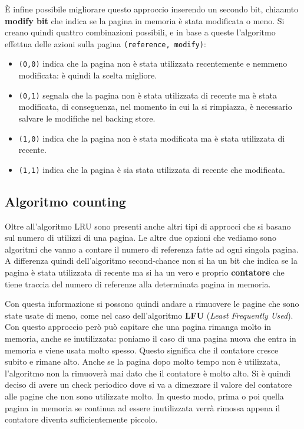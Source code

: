 È infine possibile migliorare questo approccio inserendo un secondo bit, chiaamto \textbf{modify bit} che indica se la pagina in memoria è stata modificata o meno. Si creano quindi quattro combinazioni possibili, e in base a queste l'algoritmo effettua delle azioni sulla pagina \texttt{(reference, modify)}:
\vspace{-4px}
\begin{itemize}
\setlength{\itemsep}{-1px}
    \item\texttt{(0,0)} indica che la pagina non è stata utilizzata recentemente e nemmeno modificata: è quindi la scelta migliore.
    \item\texttt{(0,1)} segnala che la pagina non è stata utilizzata di recente ma è stata modificata, di conseguenza, nel momento in cui la si rimpiazza, è necessario salvare le modifiche nel backing store.
    \item\texttt{(1,0)} indica che la pagina non è stata modificata ma è stata utilizzata di recente.
    \item\texttt{(1,1)} indica che la pagina è sia stata utilizzata di recente che modificata.
\end{itemize}

% 
\subsection{Algoritmo counting}
Oltre all'algoritmo LRU sono presenti anche altri tipi di approcci che si basano sul numero di utilizzi di una pagina. Le altre due opzioni che vediamo sono algoritmi che vanno a contare il numero di referenza fatte ad ogni singola pagina. A differenza quindi dell'algoritmo second-chance non si ha un bit che indica se la pagina è stata utilizzata di recente ma si ha un vero e proprio \textbf{contatore} che tiene traccia del numero di referenze alla determinata pagina in memoria.

Con questa informazione si possono quindi andare a rimuovere le pagine che sono state usate di meno, come nel caso dell'algoritmo \textbf{LFU} (\textit{Least Frequently Used}). Con questo approccio però può capitare che una pagina rimanga molto in memoria, anche se inutilizzata: poniamo il caso di una pagina nuova che entra in memoria e viene usata molto spesso. Questo significa che il contatore cresce subito e rimane alto. Anche se la pagina dopo molto tempo non è utilizzata, l'algoritmo non la rimuoverà mai dato che il contatore è molto alto. Si è quindi deciso di avere un check periodico dove si va a dimezzare il valore del contatore alle pagine che non sono utilizzate molto. In questo modo, prima o poi quella pagina in memoria se continua ad essere inutilizzata verrà rimossa appena il contatore diventa sufficientemente piccolo.

